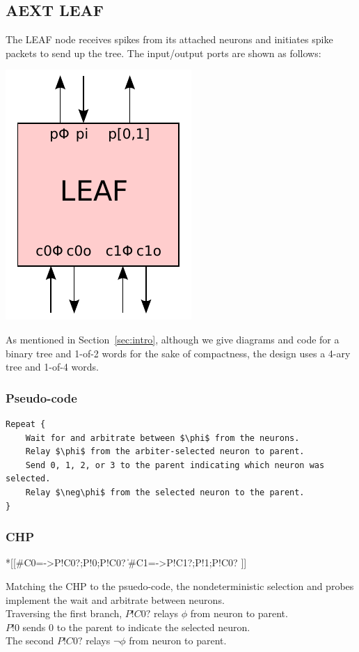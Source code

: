 \documentclass{article}
\begin{document}
\subsection{AEXT LEAF \label{sec:AEXT_LEAF}}

The LEAF node receives spikes from its attached neurons and initiates spike
packets to send up the tree. The input/output ports are shown as follows:

\begin{center}
  \includegraphics[width=.16\textwidth]{img/aext_leaf.pdf}
\end{center}

\noindent
As mentioned in Section~\ref{sec:intro}, although
we give diagrams and code for a binary tree and 1-of-2 words for the sake of 
compactness, the design uses a 4-ary tree and 1-of-4 words.

\subsubsection*{Pseudo-code}

\begin{lstlisting}[mathescape]
Repeat {
    Wait for and arbitrate between $\phi$ from the neurons.
    Relay $\phi$ from the arbiter-selected neuron to parent.
    Send 0, 1, 2, or 3 to the parent indicating which neuron was selected.
    Relay $\neg\phi$ from the selected neuron to the parent.
}
\end{lstlisting}

\subsubsection*{CHP}

\begin{csp}
*[[#{C0=\phi}->P!C0?;P!0;P!C0?
  \|#{C1=\phi}->P!C1?;P!1;P!C0?
 ]]
\end{csp}

\noindent
Matching the CHP to the psuedo-code, the nondeterministic selection and 
probes implement the wait and arbitrate between neurons. \\
Traversing the first branch, $P!C0?$ relays $\phi$ from neuron to parent. \\
$P!0$ sends $0$ to the parent to indicate the selected neuron. \\
The second $P!C0?$ relays $\neg\phi$ from neuron to parent.
\end{document}
